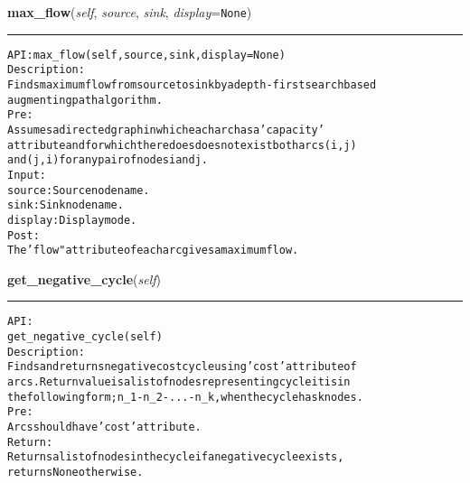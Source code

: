     \label{coinor:gimpy:graph:Graph:max_flow}

    \vspace{0.5ex}

\hspace{.8\funcindent}\begin{boxedminipage}{\funcwidth}

    \raggedright \textbf{max\_flow}(\textit{self}, \textit{source}, \textit{sink}, \textit{display}={\tt None})

    \vspace{-1.5ex}

    \rule{\textwidth}{0.5\fboxrule}
\setlength{\parskip}{2ex}
\begin{alltt}

API: max\_flow(self, source, sink, display=None)
Description:
Finds maximum flow from source to sink by a depth-first search based
augmenting path algorithm.
Pre:
    Assumes a directed graph in which each arc has a 'capacity'
    attribute and for which there does does not exist both arcs (i,j)
    and (j, i) for any pair of nodes i and j.
Input:
    source: Source node name.
    sink: Sink node name.
    display: Display mode.
Post:
    The 'flow" attribute of each arc gives a maximum flow.
\end{alltt}

\setlength{\parskip}{1ex}
    \end{boxedminipage}

    \label{coinor:gimpy:graph:Graph:get_negative_cycle}

    \vspace{0.5ex}

\hspace{.8\funcindent}\begin{boxedminipage}{\funcwidth}

    \raggedright \textbf{get\_negative\_cycle}(\textit{self})

    \vspace{-1.5ex}

    \rule{\textwidth}{0.5\fboxrule}
\setlength{\parskip}{2ex}
\begin{alltt}

API:
    get\_negative\_cycle(self)
Description:
    Finds and returns negative cost cycle using 'cost' attribute of
    arcs. Return value is a list of nodes representing cycle it is in
    the following form; n\_1-n\_2-...-n\_k, when the cycle has k nodes.
Pre:
    Arcs should have 'cost' attribute.
Return:
    Returns a list of nodes in the cycle if a negative cycle exists,
    returns None otherwise.
\end{alltt}

\setlength{\parskip}{1ex}
    \end{boxedminipage}

